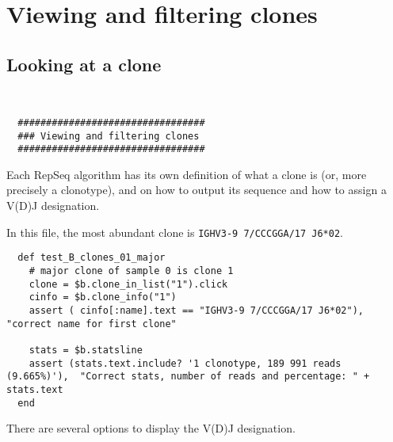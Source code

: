 \section{Viewing and filtering clones}


\subsection{Looking at a clone}
\begin{verbatim}


  #################################
  ### Viewing and filtering clones
  #################################

\end{verbatim}

Each RepSeq algorithm has its own definition of what a clone is (or, more precisely
a clonotype), and on how to output its sequence and how to assign a V(D)J designation.

In this file, the most abundant clone
is \texttt{IGHV3-9 7/CCCGGA/17 J6*02}.



\begin{verbatim}
  def test_B_clones_01_major
    # major clone of sample 0 is clone 1 
    clone = $b.clone_in_list("1").click
    cinfo = $b.clone_info("1")
    assert ( cinfo[:name].text == "IGHV3-9 7/CCCGGA/17 J6*02"), "correct name for first clone"

    stats = $b.statsline
    assert (stats.text.include? '1 clonotype, 189 991 reads (9.665%)'),  "Correct stats, number of reads and percentage: " + stats.text
  end
\end{verbatim}


There are several options to display the V(D)J designation.


